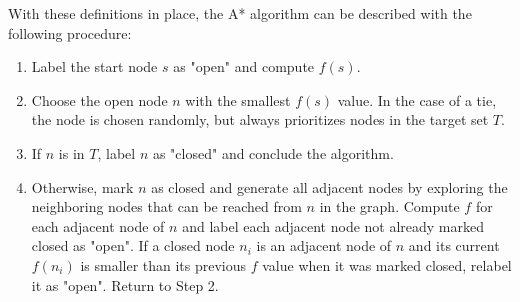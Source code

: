     With these definitions in place, the A* algorithm can be described with the following procedure:

    \begin{enumerate}
        \item Label the start node $s$ as "open" and compute $f(s)$.
        \item Choose the open node $n$ with the smallest $f(s)$ value. In the case of a tie, the node is chosen randomly, but always prioritizes nodes in the target set $T$.
        \item If $n$ is in $T$, label $n$ as "closed" and conclude the algorithm.
        \item Otherwise, mark $n$ as closed and generate all adjacent nodes by exploring the neighboring nodes that can be reached from $n$ in the graph. Compute $f$ for each adjacent node of $n$ and label each adjacent node not already marked closed as "open". If a closed node $n_i$ is an adjacent node of $n$ and its current $f(n_{i})$ is smaller than its previous $f$ value when it was marked closed, relabel it as "open". Return to Step 2.
    \end{enumerate}